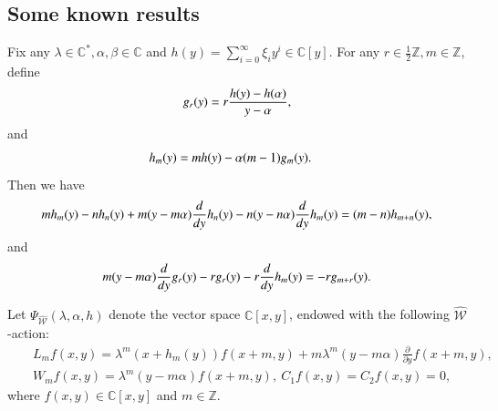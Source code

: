 \documentclass[12pt,reqno]{amsart}
\def\Z{\mathbb{Z}}
\def\C{\mathbb{C}}
\numberwithin{equation}{section}
\begin{document}
\subsection{Some known results}
Fix any $\lambda\in\C^*, \alpha, \beta\in\C$ and $h(y)=\sum_{i=0}^{\infty}\xi_iy^i\in\C[y]$. For any $r\in\frac{1}{2}\Z,m\in\Z$,  define
\begin{equation}\label{formula 2.1}
\aligned
g_{r}(y)=r\frac{h(y)-h(\alpha)}{y-\alpha},
\endaligned
\end{equation}
and
\begin{equation}\label{formula 2.2}
\aligned
h_{m}(y)&=mh(y)-\alpha(m-1) g_m(y).
\endaligned
\end{equation}
Then we have
\begin{equation}\label{formula 2.3}
\aligned
mh_m(y)-nh_n(y)
+m(y-m\alpha)\frac{d}{dy}h_n(y)
-n(y-n\alpha)\frac{d}{dy}h_m(y)
=(m-n)h_{m+n}(y),
\endaligned
\end{equation}
and
\begin{equation}\label{formula 2.4}
\aligned
m(y-m\alpha)\frac{d}{dy}g_r(y)-rg_r(y)
-r\frac{d}{dy}h_m(y)
=-rg_{m+r}(y).
\endaligned
\end{equation}
 
Let $\Psi_{\hat{\mathcal{W}}}(\lambda,\alpha,h)$
denote the vector space $\mathbb C[x,y]$, endowed with the following $\hat{\mathcal W}$-action:
\begin{eqnarray*}
&&L_m f(x,y)=\lambda^m(x+h_{m}(y))f(x+m,y)+m\lambda^m(y-m\alpha)\frac{\partial }{\partial y}f(x+m,y), 
\\&& 
W_m f(x,y)=\lambda^m(y-m\alpha)f(x+m,y),
\ 
C_1 f(x,y) = C_2 f(x,y) =0,\label{formular 2.1.3.3}
\end{eqnarray*}
where $f(x,y)\in\C[x,y]$ and $m\in\Z$.
\end{document}
